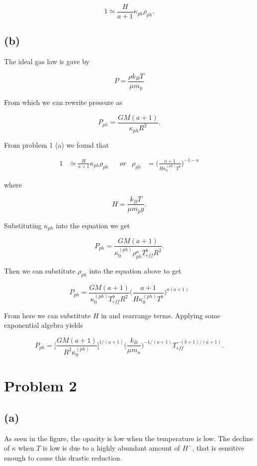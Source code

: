 \documentclass[11pt]{article}
\begin{document}
$$
1 \simeq \frac{H}{a + 1} \kappa_{ph}\rho_{ph}.
$$

\subsection*{(b)}

The ideal gas law is gave by

$$
P = \frac{\rho k_{B} T}{\mu m_{p}} 
$$

From which we can rewrite pressure as

$$
P_{ph} = \frac{GM(a + 1)}{\kappa_{ph} R^{2}}.
$$


From problem 1 (a) we found that 

\begin{align*}
    1 &\simeq \frac{H}{a + 1} \kappa_{ph}\rho_{ph}
    && or & \rho_{ph} &= \Bigg(\frac{a + 1}{H\kappa^{(ph)}_{0}T^{b}}\Bigg)^{-1-a}
\end{align*}

where

$$
H = \frac{k_{B} T}{\mu m_{p} g}.
$$

Substituting $\kappa_{ph}$ into the equation we get

$$
P_{ph} = \frac{GM(a + 1)}{\kappa_{0}^{(ph)} \rho^{a}_{ph} T^{b}_{eff} R^{2}}.
$$

Then we can substitute $\rho_{ph}$ into the equation above to get

$$
P_{ph} = \frac{GM(a + 1)}{\kappa_{0}^{(ph)}  T^{b}_{eff} R^{2}} \Bigg(\frac{a + 1}{H\kappa^{(ph)}_{0}T^{b}}\Bigg)^{a(a+1)}
$$

From here we can substitute $H$ in and rearrange terms. Applying some exponential algebra yields

$$
P_{ph} = \Bigg[\frac{GM(a+1)}{R^{2}\kappa_{0}^{(ph)}}\Bigg]^{1/(a+1)} \Bigg(\frac{k_{B}}{\mu m_{u}}\Bigg)^{-1/(a+1)} T_{eff}^{-(b+1)/(a+1)}.
$$

\clearpage

\section*{Problem 2}

\subsection*{(a)}

As seen in the figure, the opacity  is low when the temperature is low. The decline of $\kappa$ when $T$ is low is due to a highly abundant amount of $H^{-}$, that is sensitive enough to cause this drastic reduction.  
\end{document}
